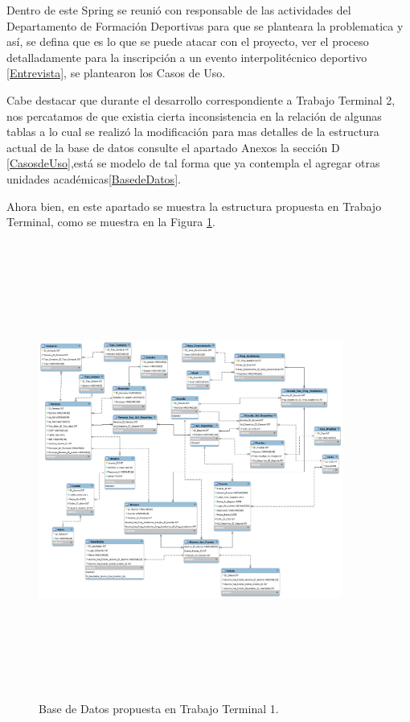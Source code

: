 	\noindent Dentro de este Spring se reunió con responsable de las actividades del Departamento de Formación Deportivas para que se planteara la problematica y así, se defina que es lo que se puede atacar con el proyecto, ver el proceso detalladamente para la inscripción a un evento interpolitécnico deportivo \ref{Entrevista}, se plantearon los Casos de Uso. 
	
	\noindent Cabe destacar que durante el desarrollo correspondiente a Trabajo Terminal 2, nos percatamos de que existia cierta inconsistencia en la relación de algunas tablas a lo cual se realizó la modificación para mas detalles de la estructura actual de la base de datos consulte el apartado Anexos la sección D \ref{CasosdeUso},está se modelo de tal forma que ya contempla el agregar otras unidades académicas\ref{BasedeDatos}. 
	
	\noindent Ahora bien, en este apartado se muestra la estructura propuesta en Trabajo Terminal, como se muestra en la Figura \ref{basededatosInicial}. 
	\pagebreak
	
	\begin{figure}[hbt!]
		\centering
		\includegraphics[angle=90, width=10cm, height=15cm]{Imagenes/BasedeDatos}
		\caption{Base de Datos propuesta en Trabajo Terminal 1.}
		\label{basededatosInicial}
	\end{figure}
	
